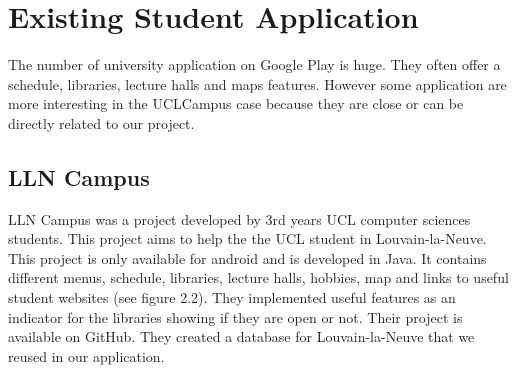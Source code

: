 \documentclass[11pt, a4paper]{report}
\begin{document}
\section{Existing Student Application}

The number of university application on Google Play is huge. They often offer a schedule, libraries, lecture halls and maps features. However some application are more interesting in the UCLCampus case because they are close or can be directly related to our project.  

\subsection{LLN Campus}
LLN Campus was a project developed by 3rd years UCL computer sciences students. This project aims to help the the UCL student in Louvain-la-Neuve. This project is only available for android and is developed in Java. It contains different menus, schedule, libraries, lecture halls, hobbies, map and links to useful student websites (see figure 2.2). They implemented useful features as an indicator for the libraries showing if they are open or not. Their project is available on GitHub. They created a database for Louvain-la-Neuve that we reused in our application. 
\end{document}
